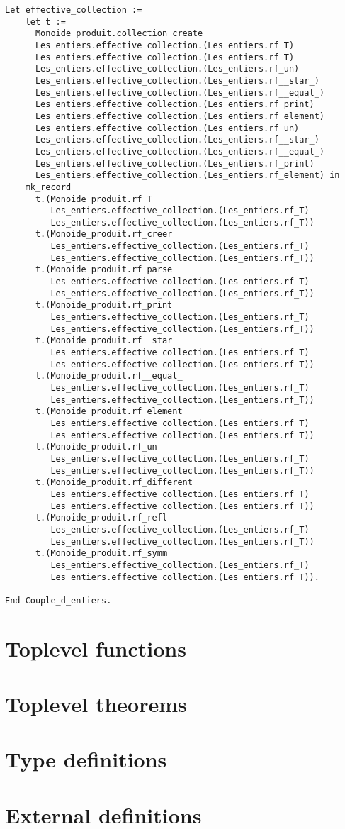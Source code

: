 {\begin{lstlisting}[language=MyCoq]
  Let effective_collection :=
    let t :=
      Monoide_produit.collection_create
      Les_entiers.effective_collection.(Les_entiers.rf_T)
      Les_entiers.effective_collection.(Les_entiers.rf_T)
      Les_entiers.effective_collection.(Les_entiers.rf_un)
      Les_entiers.effective_collection.(Les_entiers.rf__star_)
      Les_entiers.effective_collection.(Les_entiers.rf__equal_)
      Les_entiers.effective_collection.(Les_entiers.rf_print)
      Les_entiers.effective_collection.(Les_entiers.rf_element)
      Les_entiers.effective_collection.(Les_entiers.rf_un)
      Les_entiers.effective_collection.(Les_entiers.rf__star_)
      Les_entiers.effective_collection.(Les_entiers.rf__equal_)
      Les_entiers.effective_collection.(Les_entiers.rf_print)
      Les_entiers.effective_collection.(Les_entiers.rf_element) in 
    mk_record
      t.(Monoide_produit.rf_T
         Les_entiers.effective_collection.(Les_entiers.rf_T)
         Les_entiers.effective_collection.(Les_entiers.rf_T))
      t.(Monoide_produit.rf_creer
         Les_entiers.effective_collection.(Les_entiers.rf_T)
         Les_entiers.effective_collection.(Les_entiers.rf_T))
      t.(Monoide_produit.rf_parse
         Les_entiers.effective_collection.(Les_entiers.rf_T)
         Les_entiers.effective_collection.(Les_entiers.rf_T))
      t.(Monoide_produit.rf_print
         Les_entiers.effective_collection.(Les_entiers.rf_T)
         Les_entiers.effective_collection.(Les_entiers.rf_T))
      t.(Monoide_produit.rf__star_
         Les_entiers.effective_collection.(Les_entiers.rf_T)
         Les_entiers.effective_collection.(Les_entiers.rf_T))
      t.(Monoide_produit.rf__equal_
         Les_entiers.effective_collection.(Les_entiers.rf_T)
         Les_entiers.effective_collection.(Les_entiers.rf_T))
      t.(Monoide_produit.rf_element
         Les_entiers.effective_collection.(Les_entiers.rf_T)
         Les_entiers.effective_collection.(Les_entiers.rf_T))
      t.(Monoide_produit.rf_un
         Les_entiers.effective_collection.(Les_entiers.rf_T)
         Les_entiers.effective_collection.(Les_entiers.rf_T))
      t.(Monoide_produit.rf_different
         Les_entiers.effective_collection.(Les_entiers.rf_T)
         Les_entiers.effective_collection.(Les_entiers.rf_T))
      t.(Monoide_produit.rf_refl
         Les_entiers.effective_collection.(Les_entiers.rf_T)
         Les_entiers.effective_collection.(Les_entiers.rf_T))
      t.(Monoide_produit.rf_symm
         Les_entiers.effective_collection.(Les_entiers.rf_T)
         Les_entiers.effective_collection.(Les_entiers.rf_T)).
    
End Couple_d_entiers.
\end{lstlisting}
}


\section{Toplevel functions}
\section{Toplevel theorems}
\section{Type definitions}
\section{External definitions}
